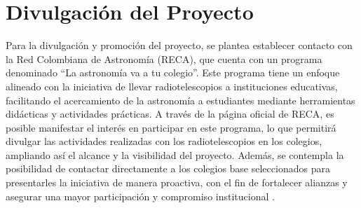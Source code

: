 \section{Divulgación del Proyecto}%
\label{sec:Divulgación del Proyecto}

Para la divulgación y promoción del proyecto, se plantea establecer contacto con
la Red Colombiana de Astronomía (RECA), que cuenta con un programa denominado
``La astronomía va a tu colegio''.
Este programa tiene un enfoque alineado con la iniciativa de llevar
radiotelescopios a instituciones educativas, facilitando el acercamiento de la
astronomía a estudiantes mediante herramientas didácticas y actividades prácticas.
A través de la página oficial de RECA, es posible manifestar el interés en
participar en este programa, lo que permitirá divulgar las actividades realizadas
con los radiotelescopios en los colegios, ampliando así el alcance y la
visibilidad del proyecto.
Además, se contempla la posibilidad de contactar directamente a los colegios
base seleccionados para presentarles la iniciativa de manera proactiva, con el
fin de fortalecer alianzas y asegurar una mayor participación y compromiso
institucional \cite{reca2025}.
